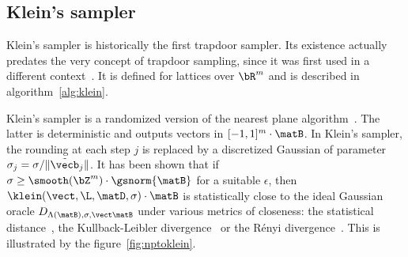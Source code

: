 \subsection{Klein's sampler}\label{sec:ffs:prelim:klein}


Klein's sampler is historically the first trapdoor sampler. Its existence actually predates the very concept of trapdoor sampling, since it was first used in a different context~\cite{SODA:Klein00}. It is defined for lattices over $\bR^m$ and is described in algorithm~\ref{alg:klein}.

 \begin{algorithm}[H]
 \caption{$\klein(\vect, \L, \matD, \sigma)$}
 \label{alg:klein}
 \begin{algorithmic}[1]
 \EndFor                                                                                                             
 \Return{$\vecz$}
  \end{algorithmic}
 \end{algorithm}
 Klein's sampler is a randomized version of the nearest plane algorithm~\cite{STACS:Babai85,Combinatorica:Babai86}. The latter is deterministic and outputs vectors in $[-1,1]^m \cdot \matB$. In Klein's sampler, the rounding at each step $j$ is replaced by a discretized Gaussian of parameter $\sigma_j = \sigma/\|\tilde\vecb_j\|$. It has been shown that if $\sigma \geq \smooth(\bZ^m) \cdot \gsnorm{\matB}$ for a suitable $\epsilon$, then $\klein(\vect, \L, \matD, \sigma) \cdot \matB$ is statistically close to the ideal Gaussian oracle $D_{\Lambda(\matB), \sigma, \vect \matB}$ under various metrics of closeness: the statistical distance~\cite{AC:DucNgu12a}, the Kullback-Leibler divergence~\cite{AC:DucLyuPre14} or the R\'enyi divergence~\cite{AC:Prest17}. This is illustrated by the figure~\ref{fig:nptoklein}.
 

